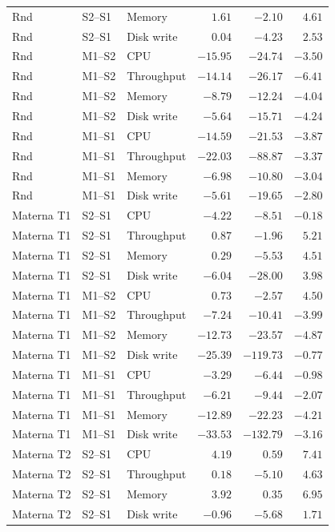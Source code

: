 \documentclass[a4paper,11pt]{article}
\begin{document}
\begin{longtable}{@{}lllrrr@{}}
  Rnd & S2--S1 & Memory & $ 1.61$ & $-2.10$ & $ 4.61$ \\
  Rnd & S2--S1 & Disk write & $ 0.04$ & $-4.23$ & $ 2.53$ \\
  Rnd & M1--S2 & CPU & $-15.95$ & $-24.74$ & $-3.50$ \\
  Rnd & M1--S2 & Throughput & $-14.14$ & $-26.17$ & $-6.41$ \\
  Rnd & M1--S2 & Memory & $-8.79$ & $-12.24$ & $-4.04$ \\
  Rnd & M1--S2 & Disk write & $-5.64$ & $-15.71$ & $-4.24$ \\
  Rnd & M1--S1 & CPU & $-14.59$ & $-21.53$ & $-3.87$ \\
  Rnd & M1--S1 & Throughput & $-22.03$ & $-88.87$ & $-3.37$ \\
  Rnd & M1--S1 & Memory & $-6.98$ & $-10.80$ & $-3.04$ \\
  Rnd & M1--S1 & Disk write & $-5.61$ & $-19.65$ & $-2.80$ \\
  Materna T1 & S2--S1 & CPU & $-4.22$ & $-8.51$ & $-0.18$ \\
  Materna T1 & S2--S1 & Throughput & $ 0.87$ & $-1.96$ & $ 5.21$ \\
  Materna T1 & S2--S1 & Memory & $ 0.29$ & $-5.53$ & $ 4.51$ \\
  Materna T1 & S2--S1 & Disk write & $-6.04$ & $-28.00$ & $ 3.98$ \\
  Materna T1 & M1--S2 & CPU & $ 0.73$ & $-2.57$ & $ 4.50$ \\
  Materna T1 & M1--S2 & Throughput & $-7.24$ & $-10.41$ & $-3.99$ \\
  Materna T1 & M1--S2 & Memory & $-12.73$ & $-23.57$ & $-4.87$ \\
  Materna T1 & M1--S2 & Disk write & $-25.39$ & $-119.73$ & $-0.77$ \\
  Materna T1 & M1--S1 & CPU & $-3.29$ & $-6.44$ & $-0.98$ \\
  Materna T1 & M1--S1 & Throughput & $-6.21$ & $-9.44$ & $-2.07$ \\
  Materna T1 & M1--S1 & Memory & $-12.89$ & $-22.23$ & $-4.21$ \\
  Materna T1 & M1--S1 & Disk write & $-33.53$ & $-132.79$ & $-3.16$ \\
  Materna T2 & S2--S1 & CPU & $ 4.19$ & $ 0.59$ & $ 7.41$ \\
  Materna T2 & S2--S1 & Throughput & $ 0.18$ & $-5.10$ & $ 4.63$ \\
  Materna T2 & S2--S1 & Memory & $ 3.92$ & $ 0.35$ & $ 6.95$ \\
  Materna T2 & S2--S1 & Disk write & $-0.96$ & $-5.68$ & $ 1.71$ \\

\end{longtable}
\end{document}
